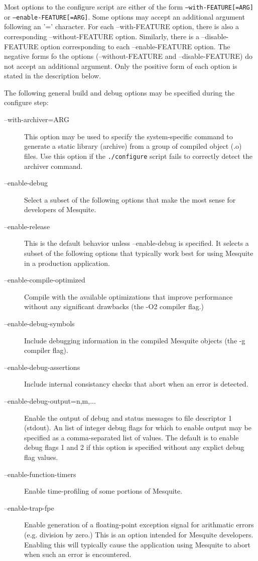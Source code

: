 Most options to the configure script are either of the form \texttt{--with-FEATURE[=ARG]} or
\texttt{--enable-FEATURE[=ARG]}.  Some options may accept an additional argument following 
an '=' character.  For each --with-FEATURE option, there is also a corresponding
--without-FEATURE option.  Similarly, there is a --disable-FEATURE option 
corresponding to each --enable-FEATURE option.  The negative forms fo the options 
(--without-FEATURE and --disable-FEATURE) do not accept an additional argument.  
Only the positive form of each option is stated in the description below.  

\label{config_options}
The following general build and debug options may be specified during the configure step:
\begin{description}
\item[--with-archiver=ARG]  This option may be used to specify the
system-specific command to generate a static library (archive) from a group
of compiled object (.o) files.  Use this option if the \texttt{./configure} script fails to correctly detect the archiver command.
\item[--enable-debug]  Select a subset of the following options that
make the most sense for developers of Mesquite.
\item[--enable-release]  This is the default behavior unless 
--enable-debug is specified.  It selects a subset of the following options that
typically work best for using Mesquite in a production application.
\item[--enable-compile-optimized] Compile with the available 
optimizations that improve performance without any significant drawbacks 
(the -O2 compiler flag.)
\item[--enable-debug-symbols] Include debugging information in
the compiled Mesquite objects (the -g compiler flag).
\item[--enable-debug-assertions]  Include internal consistancy 
checks that abort when an error is detected.
\item[--enable-debug-output=n,m,...]  Enable the output of
debug and status messages to file descriptor 1 (stdout).  An 
list of integer debug flags for which to enable output may be specified 
as a comma-separated list of values.  The default is to enable debug
flags 1 and 2 if this option is specified without any explict debug
flag values.
\item[--enable-function-timers]  Enable time-profiling of
some portions of Mesquite.
\item[--enable-trap-fpe]  Enable generation of a floating-point
exception signal for arithmatic errors (e.g. division by zero.)  This is
an option intended for Mesquite developers.  Enabling this will typically cause
the application using Mesquite to abort when such an error is encountered.
\end{description}

